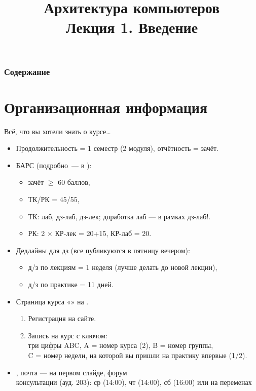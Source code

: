 \newcommand{\h}{handout,%
}



\title[Архитектура компьютеров. Лекция 1]{Архитектура компьютеров\texorpdfstring{\\}{ }Лекция 1. Введение}



\begin{frame}
\titlepage
\end{frame}

\begin{frame}
\frametitle{Содержание}
\tableofcontents[hideallsubsections]
\end{frame}

\section {Организационная информация}

\begin{frame}{Всё, что вы хотели знать о курсе\ldots}
\begin{itemize}[<+->]
	\item Продолжительность = 1 семестр (2 модуля), отчётность = зачёт.
	\item БАРС (подробно~---
		в ):\footnotesize{
		\begin{itemize}
		\item зачёт ${\geqslant}$ 60 баллов,
		\item ТК/РК = 45/55,
		\item ТК: лаб, дз-лаб, дз-лек; доработка лаб — в рамках дз-лаб!.
		\item РК: 2 ${\times}$ КР-лек = 20+15, КР-лаб = 20.
		\end{itemize}}
	\item Дедлайны для дз (все публикуются в пятницу вечером): \footnotesize{
		\begin{itemize}
		\item д/з по лекциям  = 1 неделя (лучше делать до новой лекции),
		\item д/з по практике = 11 дней.
		\end{itemize}}
	\item Страница курса «» на .\footnotesize{
		\begin{enumerate}
		\item Регистрация на сайте.
		\item Запись на курс с ключом:\\
		три цифры ABC, A =  номер курса (2), B = номер группы,\\
		C = номер недели, на которой вы пришли на практику впервые (1/2).
		\end{enumerate}}
	\item {},
		почта — на первом слайде, форум
		\\ \footnotesize{консультации (ауд. 203): ср (14:00), чт (14:00), сб (16:00) или на переменах}
\end{itemize}
\end{frame}

